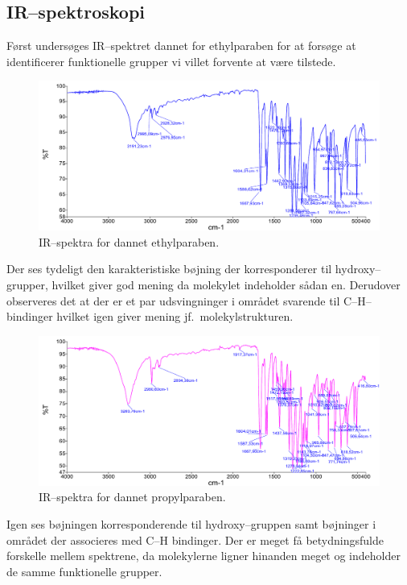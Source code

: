     \subsection{IR--spektroskopi}
    Først undersøges IR--spektret dannet for ethylparaben for at forsøge at identificerer funktionelle grupper vi villet forvente at være tilstede.
    \begin{figure}[H]
        \includegraphics[width=\linewidth]{bilag/ethylir}
        \caption{IR--spektra for dannet ethylparaben.}
    \end{figure}
    Der ses tydeligt den karakteristiske bøjning der korresponderer til hydroxy--grupper, hvilket giver god mening da molekylet indeholder sådan en. Derudover observeres det at der er et par udsvingninger i området svarende til C--H--bindinger hvilket igen giver mening jf.\ molekylstrukturen.
    \begin{figure}[H]
        \includegraphics[width=\linewidth]{bilag/propylir}
        \caption{IR--spektra for dannet propylparaben.}
    \end{figure}
    Igen ses bøjningen korresponderende til hydroxy--gruppen samt bøjninger i området der associeres med C--H bindinger. Der er meget få betydningsfulde forskelle mellem spektrene, da molekylerne ligner hinanden meget og indeholder de samme funktionelle grupper.

